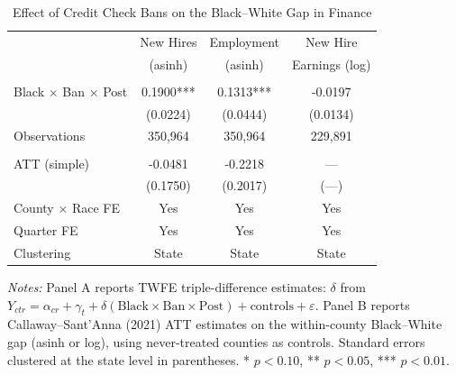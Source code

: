 \begin{table}[htbp]
\centering
\caption{Effect of Credit Check Bans on the Black--White Gap in Finance}
\label{tab:main}
\begin{tabular}{lccc}
\toprule
 & New Hires & Employment & New Hire \\
 & (asinh) & (asinh) & Earnings (log) \\
\midrule
\addlinespace
\multicolumn{4}{l}{\textit{Panel A: TWFE Triple-Difference}} \\
\addlinespace
Black $\times$ Ban $\times$ Post & 0.1900*** & 0.1313*** & -0.0197 \\
 & (0.0224) & (0.0444) & (0.0134) \\
\addlinespace
Observations & 350,964 & 350,964 & 229,891 \\
\addlinespace
\multicolumn{4}{l}{\textit{Panel B: Callaway--Sant'Anna on Black--White Gap}} \\
\addlinespace
ATT (simple) & -0.0481 & -0.2218 & --- \\
 & (0.1750) & (0.2017) & (---) \\
\addlinespace
County $\times$ Race FE & Yes & Yes & Yes \\
Quarter FE & Yes & Yes & Yes \\
Clustering & State & State & State \\
\bottomrule
\end{tabular}
\begin{tablenotes}
\small
\item \textit{Notes:} Panel A reports TWFE triple-difference estimates: $\delta$ from $Y_{ctr} = \alpha_{cr} + \gamma_t + \delta(\text{Black} \times \text{Ban} \times \text{Post}) + \text{controls} + \varepsilon$. Panel B reports Callaway--Sant'Anna (2021) ATT estimates on the within-county Black--White gap (asinh or log), using never-treated counties as controls. Standard errors clustered at the state level in parentheses. * $p<0.10$, ** $p<0.05$, *** $p<0.01$.
\end{tablenotes}
\end{table}
